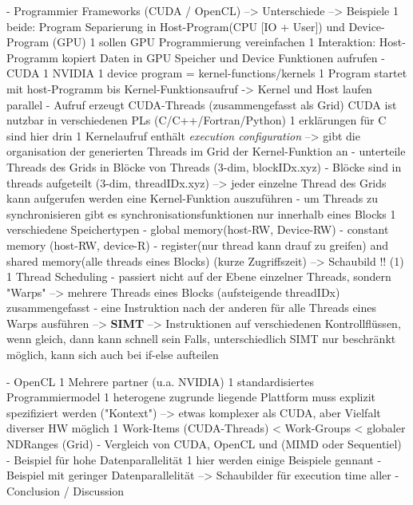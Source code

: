 \documentclass[a4paper,12pt]{llncs}
\numberwithin{equation}{section}
\begin{document}
  - Programmier Frameworks (CUDA / OpenCL)	
    --> Unterschiede
    --> Beispiele
    1 beide: Program Separierung in Host-Program(CPU [IO + User]) und Device-Program (GPU)
    1 sollen GPU Programmierung vereinfachen
    1 Interaktion: Host-Programm kopiert Daten in GPU Speicher und Device Funktionen aufrufen
    - CUDA
      1 NVIDIA
      1 device program = kernel-functions/kernels
      1 Program startet mit host-Programm bis Kernel-Funktionsaufruf -> Kernel und Host laufen parallel
      	- Aufruf erzeugt CUDA-Threads (zusammengefasst als Grid)
      CUDA ist nutzbar in verschiedenen PLs (C/C++/Fortran/Python)
      1 erklärungen für C sind hier drin
	  1 Kernelaufruf enthält \textit{execution configuration}
	  	--> gibt die organisation der generierten Threads im Grid der Kernel-Funktion an
	  	  - unterteile Threads des Grids in Blöcke von Threads (3-dim, blockIDx.xyz)
	  	  - Blöcke sind in threads aufgeteilt (3-dim, threadIDx.xyz)
	   --> jeder einzelne Thread des Grids kann aufgerufen werden eine Kernel-Funktion auszuführen      
          - um Threads zu synchronisieren gibt es synchronisationsfunktionen nur innerhalb eines Blocks
      1 verschiedene Speichertypen
        - global memory(host-RW, Device-RW)
        - constant memory (host-RW, device-R)
        - register(nur thread kann drauf zu greifen) and shared memory(alle threads eines Blocks) (kurze Zugriffszeit)
        --> Schaubild !! (1)
      1 Thread Scheduling
        - passiert nicht auf der Ebene einzelner Threads, sondern "Warps" --> mehrere Threads eines Blocks (aufsteigende threadIDx) zusammengefasst
        - eine Instruktion nach der anderen für alle Threads eines Warps ausführen --> \textbf{SIMT}
          --> Instruktionen auf verschiedenen Kontrollflüssen, wenn gleich, dann kann schnell sein
          	Falls, unterschiedlich SIMT nur beschränkt möglich, kann sich auch bei if-else aufteilen
        
        
      
    - OpenCL
      1 Mehrere partner (u.a. NVIDIA) 
      1 standardisiertes Programmiermodel
      1 heterogene zugrunde liegende Plattform muss explizit spezifiziert werden ("Kontext")
        --> etwas komplexer als CUDA, aber Vielfalt diverser HW möglich
      1 Work-Items (CUDA-Threads) < Work-Groups < globaler NDRanges (Grid)
- Vergleich von CUDA, OpenCL und (MIMD oder Sequentiel)
  - Beispiel für hohe Datenparallelität
  	1 hier werden einige Beispiele gennant
  - Beispiel mit geringer Datenparallelität
  --> Schaubilder für execution time aller 
- Conclusion / Discussion
\end{document}
